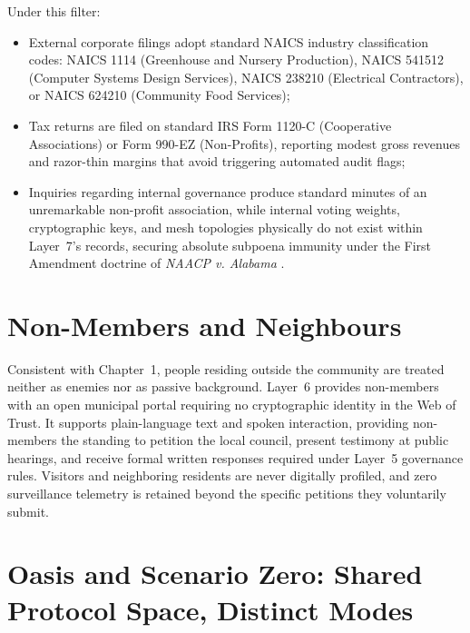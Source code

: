 Under this filter:
\begin{itemize}
  \item External corporate filings adopt standard NAICS industry classification codes: NAICS 1114 (Greenhouse and Nursery Production), NAICS 541512 (Computer Systems Design Services), NAICS 238210 (Electrical Contractors), or NAICS 624210 (Community Food Services);
  \item Tax returns are filed on standard IRS Form 1120-C (Cooperative Associations) or Form 990-EZ (Non-Profits), reporting modest gross revenues and razor-thin margins that avoid triggering automated audit flags;
  \item Inquiries regarding internal governance produce standard minutes of an unremarkable non-profit association, while internal voting weights, cryptographic keys, and mesh topologies physically do not exist within Layer~7's records, securing absolute subpoena immunity under the First Amendment doctrine of \textit{NAACP v. Alabama} \parencite{naacp1958}.
\end{itemize}

\section{Non-Members and Neighbours}

Consistent with Chapter~1, people residing outside the community are treated neither as enemies nor as passive background. Layer~6 provides non-members with an open municipal portal requiring no cryptographic identity in the Web of Trust. It supports plain-language text and spoken interaction, providing non-members the standing to petition the local council, present testimony at public hearings, and receive formal written responses required under Layer~5 governance rules. Visitors and neighboring residents are never digitally profiled, and zero surveillance telemetry is retained beyond the specific petitions they voluntarily submit.

\section{Oasis and Scenario Zero: Shared Protocol Space, Distinct Modes}

